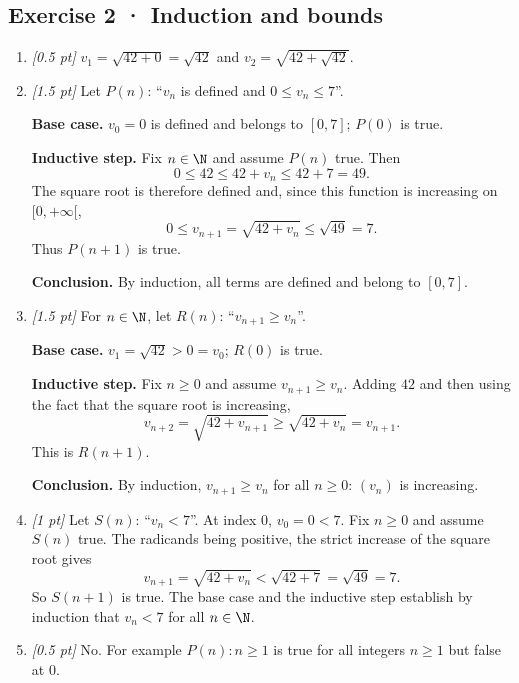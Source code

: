 \subsection*{Exercise 2 · Induction and bounds}\begin{enumerate}

\item \textit{[0.5 pt]} $v_1=\sqrt{42+0}=\sqrt{42}$ and $v_2=\sqrt{42+\sqrt{42}}$.

\item \textit{[1.5 pt]} Let $P(n)$: ``$v_n$ is defined and $0\le v_n\le 7$''.
\par\smallskip\textbf{Base case.} $v_0=0$ is defined and belongs to $[0,7]$; $P(0)$ is true.
\par\smallskip\textbf{Inductive step.} Fix $n\in\N$ and assume $P(n)$ true. Then
\[0\le 42\le 42+v_n\le 42+7=49.\]
The square root is therefore defined and, since this function is increasing on $[0,+\infty[$,
\[0\le v_{n+1}=\sqrt{42+v_n}\le\sqrt{49}=7.\]
Thus $P(n+1)$ is true.
\par\smallskip\textbf{Conclusion.} By induction, all terms are defined and belong to $[0,7]$.

\item \textit{[1.5 pt]} For $n\in\N$, let $R(n)$: ``$v_{n+1}\ge v_n$''.
\par\smallskip\textbf{Base case.} $v_1=\sqrt{42}>0=v_0$; $R(0)$ is true.
\par\smallskip\textbf{Inductive step.} Fix $n\ge0$ and assume $v_{n+1}\ge v_n$. Adding $42$ and then using the fact that the square root is increasing,
\[v_{n+2}=\sqrt{42+v_{n+1}}\ge\sqrt{42+v_n}=v_{n+1}.\]
This is $R(n+1)$.
\par\smallskip\textbf{Conclusion.} By induction, $v_{n+1}\ge v_n$ for all $n\ge0$: $(v_n)$ is increasing.

\item \textit{[1 pt]} Let $S(n)$: ``$v_n<7$''. At index $0$, $v_0=0<7$.
Fix $n\ge0$ and assume $S(n)$ true. The radicands being positive, the strict increase of the square root gives
\[v_{n+1}=\sqrt{42+v_n}<\sqrt{42+7}=\sqrt{49}=7.\]
So $S(n+1)$ is true. The base case and the inductive step establish by induction that $v_n<7$ for all $n\in\N$.

\item \textit{[0.5 pt]} No. For example $P(n):n\ge1$ is true for all integers $n\ge1$ but false at $0$.

\end{enumerate}

